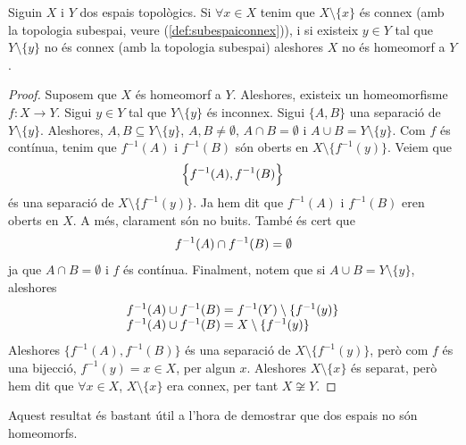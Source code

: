 \documentclass[../main.tex]{subfiles}
\begin{document}
\begin{prop}
\label{prop:connexhomeomorf1} Siguin $X$ i $Y$ dos espais topològics. Si $\forall x\in X$ tenim que $X\setminus\{x\}$ és connex (amb la topologia subespai, veure (\ref{def:subespaiconnex})), i si existeix $y\in Y$ tal que $Y\setminus\{y\}$ no és connex (amb la topologia subespai) aleshores $X$ no és homeomorf a $Y$.
\end{prop}
\begin{proof}
Suposem que $X$ és homeomorf a $Y$. Aleshores, existeix un homeomorfisme $f:X\rightarrow Y$. Sigui $y\in Y$ tal que $Y\setminus\{y\}$ és inconnex. Sigui $\{A,B\}$ una separació de $Y\setminus \{y\}$. Aleshores, $A,B\subseteq Y\setminus\{y\}$, $A,B\not=\emptyset$, $A\cap B = \emptyset$ i $A\cup B =Y\setminus\{y\}$. Com $f$ és contínua, tenim que $f^{-1}(A)$ i $f^{-1}(B)$ són oberts en $X\setminus\{f^{-1}(y)\}$. Veiem que
\begin{equation}
    \notag
    \left\{f^{-1}(A),f^{-1}(B)\right\}
\end{equation}
és una separació de $X\setminus\{f^{-1}(y)\}$. Ja hem dit que $f^{-1}(A)$ i $f^{-1}(B)$ eren oberts en $X$. A més, clarament són no buits. També és cert que
\begin{equation}
    \notag
    f^{-1}(A)\cap f^{-1}(B) = \emptyset
\end{equation}
ja que $A\cap B = \emptyset$ i $f$ és contínua. Finalment, notem que si $A\cup B = Y\setminus\{y\}$, aleshores
\begin{equation}
    \notag
    \begin{array}{ll}
        f^{-1}(A)\cup f^{-1}(B) = f^{-1}(Y)\setminus\{f^{-1}(y)\} \\
        f^{-1}(A)\cup f^{-1}(B) = X\setminus\{f^{-1}(y)\}
    \end{array}
\end{equation}
Aleshores $\{f^{-1}(A),f^{-1}(B)\}$ és una separació de $X\setminus\{f^{-1}(y)\}$, però com $f$ és una bijecció, $f^{-1}(y) = x\in X$, per algun $x$. Aleshores $X\setminus\{x\}$ és separat, però hem dit que $\forall x\in X$, $X\setminus\{x\}$ era connex, per tant $X\not\cong Y$.
\end{proof}

Aquest resultat és bastant útil a l'hora de demostrar que dos espais no són homeomorfs.
\end{document}
